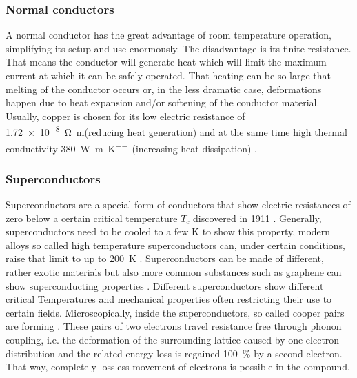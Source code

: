             \subsubsection{Normal conductors}
                A normal conductor has the great advantage of room temperature operation, simplifying its setup and use enormously. The disadvantage is  its finite resistance. That means the conductor will generate heat which will limit the maximum current at which it can be safely operated.  That heating can be so large that melting of the conductor occurs or, in the less dramatic case, deformations happen due to heat expansion and/or softening of the conductor material. Usually, copper is chosen for its low electric resistance of \SI{1.72e-8}{\ohm\meter}(reducing heat generation) and at the same time high thermal conductivity \SI{380}{\watt\per\m\per\kelvin}(increasing heat dissipation) \cite{schofield_f._h._thermal_1925}.
            \subsubsection{Superconductors}
            \label{sec:theory:superconductor}
            Superconductors are a special form of conductors that show electric resistances of zero below a certain critical temperature $T_c$ discovered in 1911 \cite{onnes_resistance_1911}. Generally, superconductors need to be cooled to a few \si{\kelvin} to show this property, modern alloys so called high temperature superconductors can, under certain conditions, raise that limit to up to \SI{200}{\kelvin} \cite{drozdov_conventional_2015}. Superconductors can be made of different, rather exotic materials but also more common substances such as graphene can show superconducting properties \cite{cao_unconventional_2018}. Different superconductors show different critical Temperatures and mechanical properties often restricting their use to certain fields. Microscopically, inside the superconductors, so called cooper pairs are forming \cite{bardeen_theory_1957}. These pairs of two electrons travel resistance free through phonon coupling, i.e. the deformation of the surrounding lattice caused by one electron distribution and the related energy loss is regained \SI{100}{\percent} by a second electron. That way, completely lossless movement of electrons is possible in the compound.
